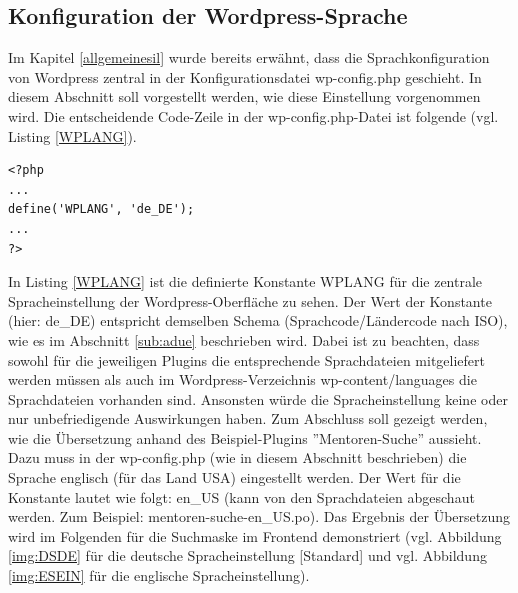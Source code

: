 \subsection{Konfiguration der Wordpress-Sprache}\label{sub:confdwpspr}
Im Kapitel \ref{allgemeinesil} wurde bereits erwähnt, dass die Sprachkonfiguration von Wordpress zentral in der Konfigurationsdatei wp-config.php geschieht. In diesem Abschnitt soll vorgestellt werden, wie diese Einstellung vorgenommen wird.\newline
Die entscheidende Code-Zeile in der wp-config.php-Datei ist folgende (vgl. Listing \ref{WPLANG}).
\begin{lstlisting}
<?php 
...
define('WPLANG', 'de_DE');
...
?> 
\end{lstlisting}	
In Listing \ref{WPLANG} ist die definierte Konstante WPLANG für die zentrale Spracheinstellung der Wordpress-Oberfläche zu sehen. Der Wert der Konstante (hier: de\_DE) entspricht demselben Schema (Sprachcode/Ländercode nach ISO), wie es im Abschnitt \ref{sub:adue} beschrieben wird.\newline
Dabei ist zu beachten, dass sowohl für die jeweiligen Plugins die entsprechende Sprachdateien mitgeliefert werden müssen als auch im Wordpress-Verzeichnis wp-content/languages die Sprachdateien vorhanden sind. Ansonsten würde die Spracheinstellung keine oder nur unbefriedigende Auswirkungen haben.\newline
Zum Abschluss soll gezeigt werden, wie die Übersetzung anhand des Beispiel-Plugins ''Mentoren-Suche'' aussieht. Dazu muss in der wp-config.php (wie in diesem Abschnitt beschrieben) die Sprache englisch (für das Land USA) eingestellt werden. Der Wert für die Konstante lautet wie folgt: en\_US (kann von den Sprachdateien abgeschaut werden. Zum Beispiel:  mentoren-suche-en\_US.po).\newline
Das Ergebnis der Übersetzung wird im Folgenden für die Suchmaske im Frontend demonstriert (vgl. Abbildung \ref{img:DSDE} für die deutsche Spracheinstellung [Standard] und vgl. Abbildung \ref{img:ESEIN} für die englische Spracheinstellung).
